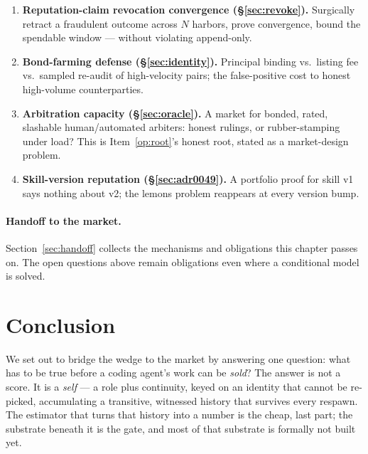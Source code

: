 \documentclass[11pt,a4paper]{article}
\theoremstyle{definition}
\begin{document}
\begin{enumerate}[leftmargin=1.6em]
  al.\ 2025: does capping reputation's marginal return restore efficiency or
  relocate the waste?
  \item\label{op:revoke} \textbf{Reputation-claim revocation convergence
  (\S\ref{sec:revoke}).}
  Surgically retract a fraudulent outcome across $N$ harbors, prove convergence,
  bound the spendable window --- without violating append-only.
  \item\label{op:bondfarm} \textbf{Bond-farming defense (\S\ref{sec:identity}).}
  Principal binding vs.\
  listing fee vs.\ sampled re-audit of high-velocity pairs; the false-positive cost
  to honest high-volume counterparties.
  \item\label{op:arbitration} \textbf{Arbitration capacity (\S\ref{sec:oracle}).} A
  market for bonded,
  rated, slashable human/automated arbiters: honest rulings, or rubber-stamping
  under load? This is Item~\ref{op:root}'s honest root, stated as a market-design
  problem.
  \item\label{op:skillver} \textbf{Skill-version reputation (\S\ref{sec:adr0049}).}
  A portfolio proof
  for skill v1 says nothing about v2; the lemons problem reappears at every version
  bump.
\end{enumerate}

\paragraph{Handoff to the market.} Section~\ref{sec:handoff} collects the mechanisms
and obligations this chapter passes on. The open questions above
remain obligations even where a conditional model is solved.
\section{Conclusion}\label{sec:conclusion}

We set out to bridge the wedge to the market by answering one question: what has to
be true before a coding agent's work can be \emph{sold}? The answer is not a score.
It is a \emph{self} --- a role plus continuity, keyed on an identity that cannot be
re-picked, accumulating a transitive, witnessed history that survives every
respawn. The estimator that turns that history into a number is the cheap, last
part; the substrate beneath it is the gate, and most of that substrate is formally
not built yet.
\end{document}

